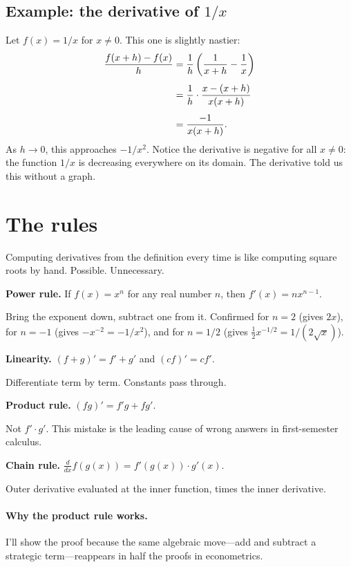 \subsection{Example: the derivative of $1/x$}

Let $f(x) = 1/x$ for $x \neq 0$. This one is slightly nastier:
\begin{align}
  \frac{f(x+h) - f(x)}{h}
    &= \frac{1}{h}\left(\frac{1}{x+h} - \frac{1}{x}\right) \notag \\[4pt]
    &= \frac{1}{h} \cdot \frac{x - (x+h)}{x(x+h)} \notag \\[4pt]
    &= \frac{-1}{x(x+h)}.
\end{align}
As $h \to 0$, this approaches $-1/x^2$. Notice the derivative is negative for all $x \neq 0$: the function $1/x$ is decreasing everywhere on its domain. The derivative told us this without a graph.

\section{The rules}

Computing derivatives from the definition every time is like computing square roots by hand. Possible. Unnecessary.

\begin{keyinsight}
\textbf{Power rule.} If $f(x) = x^n$ for any real number $n$, then $f'(x) = nx^{n-1}$.

Bring the exponent down, subtract one from it. Confirmed for $n = 2$ (gives $2x$), for $n = -1$ (gives $-x^{-2} = -1/x^2$), and for $n = 1/2$ (gives $\frac{1}{2}x^{-1/2} = 1/(2\sqrt{x})$).

\medskip
\textbf{Linearity.} $(f + g)' = f' + g'$ and $(cf)' = cf'$.

Differentiate term by term. Constants pass through.

\medskip
\textbf{Product rule.} $(fg)' = f'g + fg'$.

Not $f' \cdot g'$. This mistake is the leading cause of wrong answers in first-semester calculus.

\medskip
\textbf{Chain rule.} $\frac{d}{dx}f(g(x)) = f'(g(x)) \cdot g'(x)$.

Outer derivative evaluated at the inner function, times the inner derivative.
\end{keyinsight}

\paragraph{Why the product rule works.} I'll show the proof because the same algebraic move---add and subtract a strategic term---reappears in half the proofs in econometrics.

